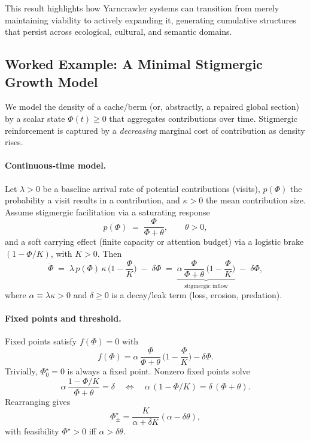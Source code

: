 \documentclass{article}
\begin{document}
This result highlights how Yarncrawler systems can transition from merely maintaining viability to actively expanding it, generating cumulative structures that persist across ecological, cultural, and semantic domains.

\subsection{Worked Example: A Minimal Stigmergic Growth Model}

We model the density of a cache/berm (or, abstractly, a repaired global section) by a scalar state
$\Phi(t)\ge 0$ that aggregates contributions over time. Stigmergic reinforcement is captured by a
\emph{decreasing} marginal cost of contribution as density rises.

\paragraph{Continuous-time model.}
Let $\lambda>0$ be a baseline arrival rate of potential contributions (visits), $p(\Phi)$ the
probability a visit results in a contribution, and $\kappa>0$ the mean contribution size.
Assume stigmergic facilitation via a saturating response
\[
p(\Phi) \;=\; \frac{\Phi}{\Phi + \theta}, \qquad \theta>0,
\]
and a soft carrying effect (finite capacity or attention budget) via a logistic brake $(1-\Phi/K)$,
with $K>0$. Then
\begin{equation}
\dot{\Phi} \;=\; \lambda\,p(\Phi)\,\kappa \,\Big(1 - \frac{\Phi}{K}\Big) \;-\; \delta \Phi
\;=\; \underbrace{\alpha\,\frac{\Phi}{\Phi+\theta}\,\Big(1 - \frac{\Phi}{K}\Big)}_{\text{stigmergic inflow}}
\;-\; \delta \Phi,
\label{eq:stigmergic-ode}
\end{equation}
where $\alpha \equiv \lambda \kappa>0$ and $\delta\ge 0$ is a decay/leak term (loss, erosion, predation).

\paragraph{Fixed points and threshold.}
Fixed points satisfy $f(\Phi)=0$ with
\[
f(\Phi)= \alpha\,\frac{\Phi}{\Phi+\theta}\,\Big(1 - \frac{\Phi}{K}\Big) - \delta \Phi.
\]
Trivially, $\Phi^\star_0=0$ is always a fixed point. Nonzero fixed points solve
\[
\alpha\,\frac{1 - \Phi/K}{\Phi+\theta} = \delta
\quad\Longleftrightarrow\quad
\alpha\,(1 - \Phi/K) = \delta\,(\Phi+\theta).
\]
Rearranging gives
\begin{equation}
\Phi^\star_{\pm}
= \frac{K}{\alpha + \delta K}
\left(\alpha - \delta \theta\right),
\label{eq:phi-star}
\end{equation}
with feasibility $\Phi^\star>0$ iff $\alpha>\delta \theta$.
\end{document}
